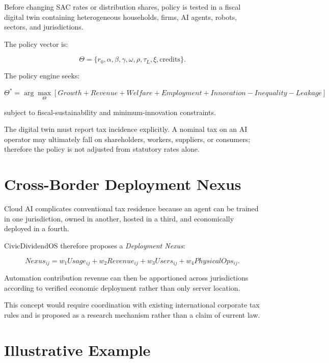 \documentclass[conference]{IEEEtran}
\begin{document}
Before changing SAC rates or distribution shares, policy is tested in a fiscal
digital twin containing heterogeneous households, firms, AI agents, robots,
sectors, and jurisdictions.

The policy vector is:

\begin{equation}
\Theta =
\{r_0,\alpha,\beta,\gamma,\omega,\rho,
\tau_L,\xi,\text{credits}\}.
\end{equation}

The policy engine seeks:

\begin{equation}
\Theta^{*}
=
\arg\max_{\Theta}
\left[
Growth + Revenue + Welfare + Employment
+ Innovation - Inequality - Leakage
\right]
\end{equation}

subject to fiscal-sustainability and minimum-innovation constraints.

The digital twin must report tax incidence explicitly. A nominal tax on an AI
operator may ultimately fall on shareholders, workers, suppliers, or consumers;
therefore the policy is not adjusted from statutory rates alone.

\section{Cross-Border Deployment Nexus}

Cloud AI complicates conventional tax residence because an agent can be trained
in one jurisdiction, owned in another, hosted in a third, and economically
deployed in a fourth.

CivicDividendOS therefore proposes a \textit{Deployment Nexus}:

\begin{equation}
Nexus_{ij}
=
w_1 Usage_{ij}
+w_2 Revenue_{ij}
+w_3 Users_{ij}
+w_4 PhysicalOps_{ij}.
\end{equation}

Automation contribution revenue can then be apportioned across jurisdictions
according to verified economic deployment rather than only server location.

This concept would require coordination with existing international corporate
tax rules and is proposed as a research mechanism rather than a claim of current
law.

\section{Illustrative Example}
\end{document}
